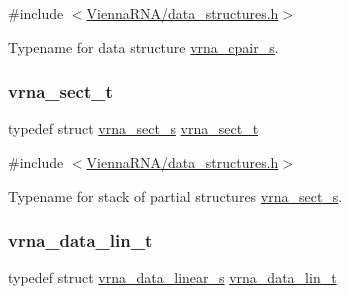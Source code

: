 {\ttfamily \#include $<$\mbox{\hyperlink{data__structures_8h}{Vienna\+R\+N\+A/data\+\_\+structures.\+h}}$>$}



Typename for data structure \mbox{\hyperlink{group__data__structures_structvrna__cpair__s}{vrna\+\_\+cpair\+\_\+s}}. 

\mbox{\label{group__data__structures_gacc9cdae790dac75a7024e7069c0d4400}} 
\subsubsection{\texorpdfstring{vrna\+\_\+sect\+\_\+t}{vrna\_sect\_t}}
{\footnotesize\ttfamily typedef struct \mbox{\hyperlink{group__data__structures_structvrna__sect__s}{vrna\+\_\+sect\+\_\+s}} \mbox{\hyperlink{group__data__structures_gacc9cdae790dac75a7024e7069c0d4400}{vrna\+\_\+sect\+\_\+t}}}



{\ttfamily \#include $<$\mbox{\hyperlink{data__structures_8h}{Vienna\+R\+N\+A/data\+\_\+structures.\+h}}$>$}



Typename for stack of partial structures \mbox{\hyperlink{group__data__structures_structvrna__sect__s}{vrna\+\_\+sect\+\_\+s}}. 

\mbox{\label{group__data__structures_gaab843d6cdafd5433e3f6fa3b834d12f9}} 
\subsubsection{\texorpdfstring{vrna\+\_\+data\+\_\+lin\+\_\+t}{vrna\_data\_lin\_t}}
{\footnotesize\ttfamily typedef struct \mbox{\hyperlink{group__data__structures_structvrna__data__linear__s}{vrna\+\_\+data\+\_\+linear\+\_\+s}} \mbox{\hyperlink{group__data__structures_gaab843d6cdafd5433e3f6fa3b834d12f9}{vrna\+\_\+data\+\_\+lin\+\_\+t}}}



